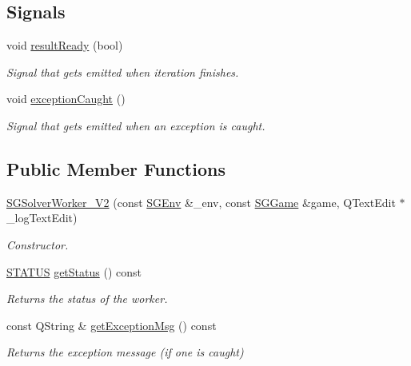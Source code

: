 \subsection*{Signals}
\begin{DoxyCompactItemize}
\item 
\mbox{\label{classSGSolverWorker__V2_ae80756d58e6da701235b0768c11bb30e}} 
void \hyperlink{classSGSolverWorker__V2_ae80756d58e6da701235b0768c11bb30e}{result\+Ready} (bool)
\begin{DoxyCompactList}\small\item\em Signal that gets emitted when iteration finishes. \end{DoxyCompactList}\item 
void \hyperlink{classSGSolverWorker__V2_a2c783d5df57142df724a1a5841e19f42}{exception\+Caught} ()
\begin{DoxyCompactList}\small\item\em Signal that gets emitted when an exception is caught. \end{DoxyCompactList}\end{DoxyCompactItemize}
\subsection*{Public Member Functions}
\begin{DoxyCompactItemize}
\item 
\hyperlink{classSGSolverWorker__V2_a34d55eba6e02311b5b8d0d8371bf54c1}{S\+G\+Solver\+Worker\+\_\+\+V2} (const \hyperlink{classSGEnv}{S\+G\+Env} \&\+\_\+env, const \hyperlink{classSGGame}{S\+G\+Game} \&game, Q\+Text\+Edit $\ast$\+\_\+log\+Text\+Edit)
\begin{DoxyCompactList}\small\item\em Constructor. \end{DoxyCompactList}\item 
\mbox{\label{classSGSolverWorker__V2_acc4d1058989b8796c021026bb3d86333}} 
\hyperlink{classSGSolverWorker__V2_a252099560187dceadfe97c1bd335c561}{S\+T\+A\+T\+US} \hyperlink{classSGSolverWorker__V2_acc4d1058989b8796c021026bb3d86333}{get\+Status} () const
\begin{DoxyCompactList}\small\item\em Returns the status of the worker. \end{DoxyCompactList}\item 
\mbox{\label{classSGSolverWorker__V2_aea389c75d22cd0196369b4259d5ae431}} 
const Q\+String \& \hyperlink{classSGSolverWorker__V2_aea389c75d22cd0196369b4259d5ae431}{get\+Exception\+Msg} () const
\begin{DoxyCompactList}\small\item\em Returns the exception message (if one is caught) \end{DoxyCompactList}\end{DoxyCompactItemize}
